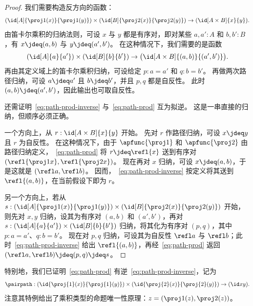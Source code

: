 \begin{proof}
  我们需要构造反方向的函数：
  \begin{equation}
    (\id[A]{\proj1(x)}{\proj1(y)}) \times (\id[B]{\proj2(x)}{\proj2(y)}) \to (\id[A\times B]{x}{y}). \label{eq:path-prod-inverse}
  \end{equation}
  由笛卡尔乘积的归纳法则，可设 $x$ 与 $y$ 都是有序对，即对某些 $a,a':A$ 和 $b,b':B$，有 $x\jdeq (a,b)$ 与 $y\jdeq (a',b')$。
  在这种情况下，我们需要的是函数
  \begin{equation*}
    (\id[A]{a}{a'}) \times (\id[B]{b}{b'}) \to \big(\id[A\times B]{(a,b)}{(a',b')}\big).
  \end{equation*}
  再由其定义域上的笛卡尔乘积归纳，可设给定 $p:a=a'$ 和 $q:b=b'$。
  再做两次路径归纳，可设 $a\jdeq a'$ 且 $b\jdeq b'$，并且 $p,q$ 都是自反性。
  此时 $(a,b)\jdeq(a',b')$，因此输出也可取自反性。

  还需证明~\eqref{eq:path-prod-inverse} 与~\eqref{eq:path-prod} 互为拟逆。
  这是一串直接的归纳，但顺序必须正确。

  一个方向上，从 $r:\id[A\times B]{x}{y}$ 开始。
  先对 $r$ 作路径归纳，可设 $x\jdeq y$ 且 $r$ 为自反性。
  在这种情况下，由于 $\apfunc{\proj1}$ 和 $\apfunc{\proj2}$ 由路径归纳定义，~\eqref{eq:path-prod} 将 $r\jdeq \refl{x}$ 送到有序对 $(\refl{\proj1x},\refl{\proj2x})$。
  现在再对 $x$ 归纳，可设 $x\jdeq (a,b)$，于是这就是 $(\refl a, \refl b)$。
  因而，~\eqref{eq:path-prod-inverse} 按定义将其送到 $\refl{(a,b)}$，在当前假设下即为 $r$。

  另一个方向上，若从 $s:(\id[A]{\proj1(x)}{\proj1(y)}) \times (\id[B]{\proj2(x)}{\proj2(y)})$ 开始，则先对 $x,y$ 归纳，设其为有序对 $(a,b)$ 和 $(a',b')$，再对 $s:(\id[A]{a}{a'}) \times (\id[B]{b}{b'})$ 归纳，将其化为有序对 $(p,q)$，其中 $p:a=a'$、$q:b=b'$。
  现在对 $p,q$ 归纳，可设其为自反性 $\refl a$ 与 $\refl b$；此时~\eqref{eq:path-prod-inverse} 给出 $\refl{(a,b)}$，再经~\eqref{eq:path-prod} 返回 $(\refl a,\refl b)\jdeq (p,q)\jdeq s$。
\end{proof}

特别地，我们已证明~\eqref{eq:path-prod} 有逆~\eqref{eq:path-prod-inverse}，记为
\[
\pairpath : (\id{\proj{1}(x)}{\proj{1}(y)}) \times (\id{\proj{2}(x)}{\proj{2}(y)}) \to (\id x y).
\]
注意其特例给出了乘积类型的命题唯一性原理：$z = (\proj1(z),\proj2(z))$。

